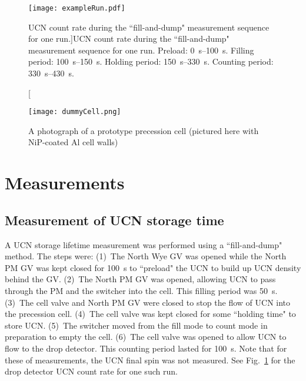 \begin{figure}[htp]
    \centering
    \texttt{[image: exampleRun.pdf]}
    \caption[UCN count rate during the ``fill-and-dump" measurement sequence for one run.]{UCN count rate during the ``fill-and-dump" measurement sequence for one run. Preload: \qtyrange{0}{100}{\s}. Filling period: \qtyrange{100}{150}{\s}. Holding period: \qtyrange{150}{330}{\s}. Counting period: \qtyrange{330}{430}{\s}.}
    \label{fig:timeSpectrum}
\end{figure}

\begin{figure}[htp]
    \centering
    \texttt{[image: dummyCell.png]}
    \caption[A photograph of a prototype precession cell]{A photograph of a prototype precession cell (pictured here with NiP-coated Al cell walls)}
    \label{fig:dummyCell}
\end{figure}


\section{\label{sec:measurement}Measurements}

\subsection{\label{subsec:holdingTimeMeasurement}Measurement of UCN storage time}


A UCN storage lifetime measurement was performed using a ``fill-and-dump" method. The steps were: (1)~The North Wye GV was opened while the North PM GV was kept closed for \qty{100}{\s} to ``preload" the UCN to build up UCN density behind the GV. (2)~The North PM GV was opened, allowing UCN to pass through the PM and the switcher into the cell. This filling period was \qty{50}{\s}. (3)~The cell valve and North PM GV were closed to stop the flow of UCN into the precession cell. (4)~The cell valve was kept closed for some ``holding time" to store UCN. (5)~The switcher moved from the fill mode to count mode in preparation to empty the cell. (6)~The cell valve was opened to allow UCN to flow to the drop detector. This counting period lasted for \qty{100}{\s}. Note that for these of measurements, the UCN final spin was not measured. See Fig.~\ref{fig:timeSpectrum} for the drop detector UCN count rate for one such run.

